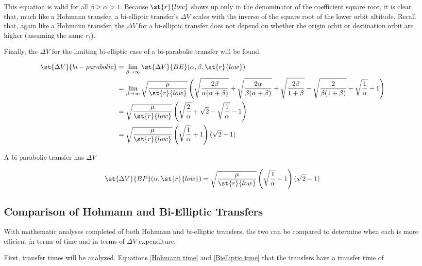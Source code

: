 \documentclass[../basicOrbitalDynamics.tex]{subfiles}
\begin{document}
This equation is valid for all $\beta\geq\alpha>1$. Because $\st{r}{low}$ shows up only in the denominator of the coefficient square root, it is clear that, much like a Hohmann transfer, a bi-elliptic transfer's $\Delta V$ scales with the inverse of the square root of the lower orbit altitude. Recall that, again like a Hohmann transfer, the $\Delta V$ for a bi-elliptic transfer does not depend on whether the origin orbit or destination orbit are higher (assuming the same $r_t$).

Finally, the $\Delta V$ for the limiting bi-elliptic case of a bi-parabolic transfer will be found.

\begin{align*}
    \st{\Delta V}{bi-parabolic} &= \lim_{\beta\rightarrow\infty}\st{\Delta V}{BE}(\alpha,\beta,\st{r}{low})\\
    &= \lim_{\beta\rightarrow\infty}\sqrt{\frac{\mu}{\st{r}{low}}}\left(\sqrt{\frac{2\beta}{\alpha(\alpha+\beta)}}+\sqrt{\frac{2\alpha}{\beta(\alpha+\beta)}}+\sqrt{\frac{2\beta}{1+\beta}}-\sqrt{\frac{2}{\beta(1+\beta)}}-\sqrt{\frac{1}{\alpha}}-1\right)\\
    &=\sqrt{\frac{\mu}{\st{r}{low}}}\left(\sqrt{\frac{2}{\alpha}}+\sqrt{2}-\sqrt{\frac{1}{\alpha}}-1\right)\\
    &=\sqrt{\frac{\mu}{\st{r}{low}}}\left(\sqrt{\frac{1}{\alpha}}+1\right)(\sqrt{2}-1)\\
\end{align*}

A bi-parabolic transfer has $\Delta V$

\begin{equation}\label{bi-parabolic Delta V}
    \st{\Delta V}{BP}(\alpha,\st{r}{low}) =\sqrt{\frac{\mu}{\st{r}{low}}}\left(\sqrt{\frac{1}{\alpha}}+1\right)(\sqrt{2}-1)
\end{equation}

\subsection{Comparison of Hohmann and Bi-Elliptic Transfers}\label{sec:Comparison of hohmann and bielliptic transfers}

With mathematic analyses completed of both Hohmann and bi-elliptic transfers, the two can be compared to determine when each is more efficient in terms of time and in terms of $\Delta V$ expenditure.

First, transfer times will be analyzed. Equations \eqref{Hohmann time} and \eqref{Bielliptic time} that the transfers have a transfer time of
\end{document}
